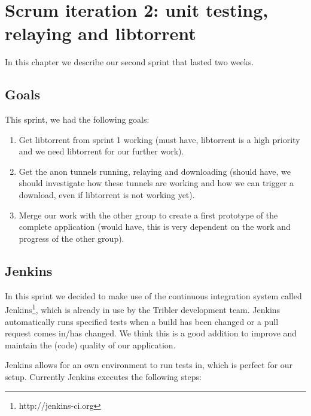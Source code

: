 \chapter{Scrum iteration 2: unit testing, relaying and libtorrent}
\label{cpt:iteration2}
	In this chapter we describe our second sprint that lasted two weeks.

	\section{Goals}
		This sprint, we had the following goals:
	
		\begin{enumerate}
			\item Get libtorrent from sprint 1 working (must have, libtorrent is a high priority and we need libtorrent for our further work).
			\item Get the anon tunnels running, relaying and downloading (should have, we should investigate how these tunnels are working and how we can trigger a download, even if libtorrent is not working yet).
			\item Merge our work with the other group to create a first prototype of the complete application (would have, this is very dependent on the work and progress of the other group).
		\end{enumerate}
	
	\section{Jenkins}
		\label{sec:jenkins}
		In this sprint we decided to make use of the continuous integration system called Jenkins\footnote{http://jenkins-ci.org}, which is already in use by the Tribler development team. Jenkins automatically runs specified tests when a build has been changed or a pull request comes in/has changed. We think this is a good addition to improve and maintain the (code) quality of our application.
		
		Jenkins allows for an own environment to run tests in, which is perfect for our setup. Currently Jenkins executes the following steps:
		
